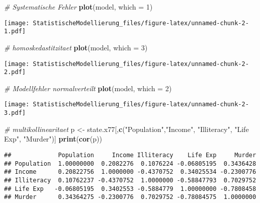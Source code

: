 \documentclass[
]{article}
\newenvironment{Shaded}{\begin{snugshade}}{\end{snugshade}}
\newcommand{\AttributeTok}[1]{\textcolor[rgb]{0.13,0.29,0.53}{#1}}
\newcommand{\CommentTok}[1]{\textcolor[rgb]{0.56,0.35,0.01}{\textit{#1}}}
\newcommand{\DecValTok}[1]{\textcolor[rgb]{0.00,0.00,0.81}{#1}}
\newcommand{\FunctionTok}[1]{\textcolor[rgb]{0.13,0.29,0.53}{\textbf{#1}}}
\newcommand{\NormalTok}[1]{#1}
\newcommand{\OtherTok}[1]{\textcolor[rgb]{0.56,0.35,0.01}{#1}}
\newcommand{\StringTok}[1]{\textcolor[rgb]{0.31,0.60,0.02}{#1}}
\begin{document}
\begin{Shaded}
\begin{Highlighting}[]
\CommentTok{\# Systematische Fehler}
\FunctionTok{plot}\NormalTok{(model, }\AttributeTok{which =} \DecValTok{1}\NormalTok{)}
\end{Highlighting}
\end{Shaded}

\texttt{[image: StatistischeModellierung\_files/figure-latex/unnamed-chunk-2-1.pdf]}

\begin{Shaded}
\begin{Highlighting}[]
\CommentTok{\# homoskedastitzitaet}
\FunctionTok{plot}\NormalTok{(model, }\AttributeTok{which =} \DecValTok{3}\NormalTok{)}
\end{Highlighting}
\end{Shaded}

\texttt{[image: StatistischeModellierung\_files/figure-latex/unnamed-chunk-2-2.pdf]}

\begin{Shaded}
\begin{Highlighting}[]
\CommentTok{\# Modellfehler normalverteilt}
\FunctionTok{plot}\NormalTok{(model, }\AttributeTok{which =} \DecValTok{2}\NormalTok{)}
\end{Highlighting}
\end{Shaded}

\texttt{[image: StatistischeModellierung\_files/figure-latex/unnamed-chunk-2-3.pdf]}

\begin{Shaded}
\begin{Highlighting}[]
\CommentTok{\# multikollinearitaet}
\NormalTok{p }\OtherTok{\textless{}{-}}\NormalTok{ state.x77[,}\FunctionTok{c}\NormalTok{(}\StringTok{"Population"}\NormalTok{,}\StringTok{"Income"}\NormalTok{, }\StringTok{"Illiteracy"}\NormalTok{, }\StringTok{"Life Exp"}\NormalTok{, }\StringTok{"Murder"}\NormalTok{)]}
\FunctionTok{print}\NormalTok{(}\FunctionTok{cor}\NormalTok{(p))}
\end{Highlighting}
\end{Shaded}

\begin{verbatim}
##             Population     Income Illiteracy    Life Exp     Murder
## Population  1.00000000  0.2082276  0.1076224 -0.06805195  0.3436428
## Income      0.20822756  1.0000000 -0.4370752  0.34025534 -0.2300776
## Illiteracy  0.10762237 -0.4370752  1.0000000 -0.58847793  0.7029752
## Life Exp   -0.06805195  0.3402553 -0.5884779  1.00000000 -0.7808458
## Murder      0.34364275 -0.2300776  0.7029752 -0.78084575  1.0000000
\end{verbatim}
\end{document}
